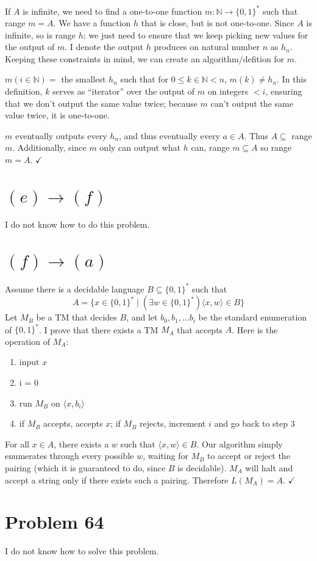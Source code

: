 \documentclass[11pt]{article}
\let\imp\rightarrow
\begin{document}
If $A$ is infinite, we need to find a one-to-one function $m: \mathbb{N} \imp \{0,1\}^*$ such that range $m = A$.
We have a function $h$ that is close, but is not one-to-one.
Since $A$ is infinite, so is range $h$; we just need to ensure that we keep picking new values for the output of $m$.
I denote the output $h$ produces on natural number $n$ as $h_n$.
Keeping these constraints in mind, we can create an algorithm/defition for $m$. 

$m(i \in \mathbb{N}) = $ the smallest $h_n$ such that for $0 \leq k \in \mathbb{N} < n$, $m( k ) \neq h_n$.
In this definition, $k$ serves as ``iterator'' over the output of $m$ on integers $< i$, ensuring that we don't output the same value twice; because $m$ can't output the same value twice, it is one-to-one.

$m$ eventually outputs every $h_n$, and thus eventually every $a \in A$. 
Thus $A \subseteq $ range $m$.
Additionally, since $m$ only can output what $h$ can, range $m \subseteq A$ so range $m = A$. $\checkmark$


\section*{$(e) \imp (f)$}

I do not know how to do this problem.


\section*{$(f) \imp (a)$}

Assume there is a decidable language $B \subseteq \{0,1\}^*$ such that
	\[A = \{x \in \{0,1\}^* \mid (\exists w \in \{0,1\}^*) \langle x, w \rangle \in B\}\]
Let $M_B$ be a TM that decides $B$, and let $b_0, b_1, \ldots b_i$ be the standard enumeration of $\{0,1\}^*$. 
I prove that there exists a TM $M_A$ that accepts $A$.
Here is the operation of $M_A$:
\begin{enumerate}
	\item input $x$
	\item i = 0
	\item run $M_B$ on $\langle x, b_i \rangle$ 
	\item if $M_B$ accepts, accepts $x$; if $M_B$ rejects, increment $i$ and go back to step 3
\end{enumerate}

For all $x \in A$, there exists a $w$ such that $\langle x, w \rangle \in B$.
Our algorithm simply enumerates through every possible $w$, waiting for $M_B$ to accept or reject the pairing (which it is guaranteed to do, since $B$ is decidable).
$M_A$ will halt and accept a string only if there exists such a pairing.
Therefore $L(M_A) = A$. $\checkmark$


\section*{Problem 64}
I do not know how to solve this problem.
\end{document}
